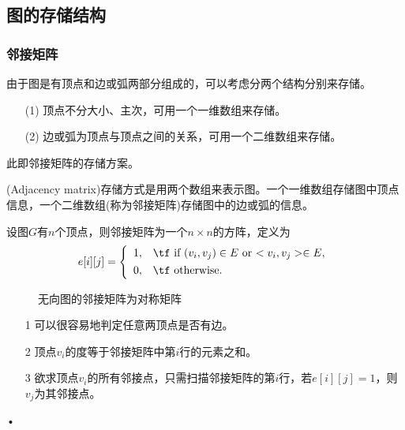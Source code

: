 \subsection{图的存储结构}

\subsubsection{邻接矩阵}
\begin{frame}\ft{\subsubsecname}
由于图是有顶点和边或弧两部分组成的，可以考虑分两个结构分别来存储。
\begin{itemize}
\item[(1)] 顶点不分大小、主次，可用一个一维数组来存储。
\item[(2)] 边或弧为顶点与顶点之间的关系，可用一个二维数组来存储。\end{itemize}
此即邻接矩阵的存储方案。
\end{frame}

\begin{frame}\ft{\subsecname}
\begin{dingyi}[邻接矩阵]
(Adjacency matrix)存储方式是用两个数组来表示图。一个一维数组存储图中顶点信息，一个二维数组(称为邻接矩阵)存储图中的边或弧的信息。
\end{dingyi}
设图$G$有$n$个顶点，则邻接矩阵为一个$n\times n$的方阵，定义为
$$
e[i][j]=\left\{
\begin{array}{ll}
1,& \mbox{\tf if $(v_i,v_j)\in E$ or $<v_i,v_j>\in E$}, \\[0.05in]
0,& \mbox{\tf otherwise}.
\end{array}
\right.
$$
\end{frame}

\begin{frame}\ft{\subsecname}
\begin{figure} 
\centering

\caption{无向图的邻接矩阵为对称矩阵}
\end{figure}
\end{frame}

\begin{frame}\ft{\subsecname}
\begin{itemize}
\item[1] 可以很容易地判定任意两顶点是否有边。\\[0.1in]
\item[2] 顶点$v_i$的度等于邻接矩阵中第$i$行的元素之和。\\[0.1in]
\item[3] 欲求顶点$v_i$的所有邻接点，只需扫描邻接矩阵的第$i$行，若$e[i][j]=1$，则$v_j$为其邻接点。

\end{itemize}•
\end{frame}

